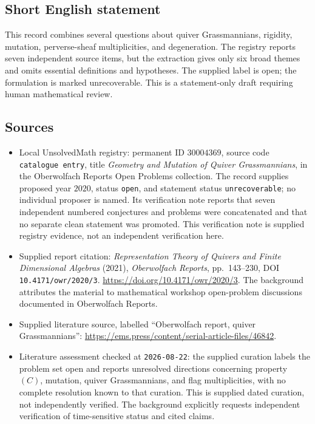 \documentclass[11pt]{article}
\begin{document}
\subsection{Short English statement}
This record combines several questions about quiver Grassmannians, rigidity, mutation, perverse-sheaf multiplicities, and degeneration. The registry reports seven independent source items, but the extraction gives only six broad themes and omits essential definitions and hypotheses. The supplied label is open; the formulation is marked unrecoverable. This is a statement-only draft requiring human mathematical review.
\subsection{Sources}
\begin{itemize}
\item Local UnsolvedMath registry: permanent ID \(30004369\), source code \texttt{catalogue entry}, title \emph{Geometry and Mutation of Quiver Grassmannians}, in the Oberwolfach Reports Open Problems collection. The record supplies proposed year \(2020\), status \texttt{open}, and statement status \texttt{unrecoverable}; no individual proposer is named. Its verification note reports that seven independent numbered conjectures and problems were concatenated and that no separate clean statement was promoted. This verification note is supplied registry evidence, not an independent verification here.
\item Supplied report citation: \emph{Representation Theory of Quivers and Finite Dimensional Algebras} (2021), \emph{Oberwolfach Reports}, pp.\ 143--230, DOI \texttt{10.4171/owr/2020/3}. \url{https://doi.org/10.4171/owr/2020/3}. The background attributes the material to mathematical workshop open-problem discussions documented in Oberwolfach Reports.
\item Supplied literature source, labelled ``Oberwolfach report, quiver Grassmannians'': \url{https://ems.press/content/serial-article-files/46842}.
\item Literature assessment checked at \texttt{2026-08-22}: the supplied curation labels the problem set open and reports unresolved directions concerning property \((C)\), mutation, quiver Grassmannians, and flag multiplicities, with no complete resolution known to that curation. This is supplied dated curation, not independently verified. The background explicitly requests independent verification of time-sensitive status and cited claims.
\end{itemize}
\end{document}
